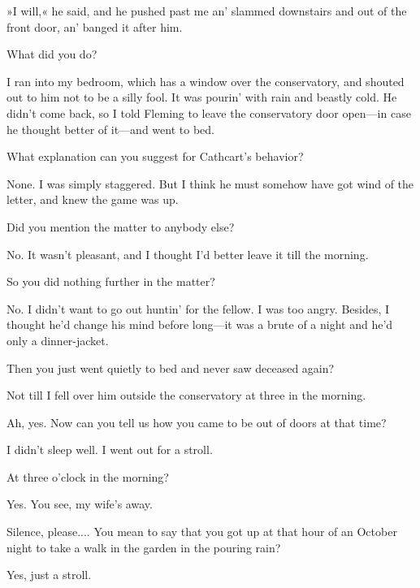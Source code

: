 \begin{dialogue}
»I will,« he said, and he pushed past me an' slammed downstairs and out of the front door, an' banged it after him.

 What did you do?

 I ran into my bedroom, which has a window over the conservatory, and shouted out to him not to be a silly fool. It was pourin' with rain and beastly cold. He didn't come back, so I told Fleming to leave the conservatory door open\allowbreak---\allowbreak in case he thought better of it\allowbreak---\allowbreak and went to bed.

 What explanation can you suggest for Cathcart's behavior?

 None. I was simply staggered. But I think he must somehow have got wind of the letter, and knew the game was up.

 Did you mention the matter to anybody else?

 No. It wasn't pleasant, and I thought I'd better leave it till the morning.

 So you did nothing further in the matter?

 No. I didn't want to go out huntin' for the fellow. I was too angry. Besides, I thought he'd change his mind before long\allowbreak---\allowbreak it was a brute of a night and he'd only a dinner-jacket.

 Then you just went quietly to bed and never saw deceased again?

 Not till I fell over him outside the conservatory at three in the morning.

 Ah, yes. Now can you tell us how you came to be out of doors at that time?

  I didn't sleep well. I went out for a stroll.

 At three o'clock in the morning?

 Yes.  You see, my wife's away. 

 Silence, please.... You mean to say that you got up at that hour of an October night to take a walk in the garden in the pouring rain?

 Yes, just a stroll. 


\end{dialogue}
